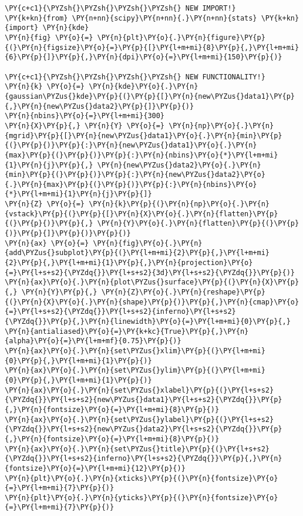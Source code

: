     \begin{tcolorbox}[breakable, size=fbox, boxrule=1pt, pad at break*=1mm,colback=cellbackground, colframe=cellborder]
\begin{Verbatim}[commandchars=\\\{\}]
\PY{c+c1}{\PYZsh{}\PYZsh{}\PYZsh{}\PYZsh{} NEW IMPORT!}
\PY{k+kn}{from} \PY{n+nn}{scipy}\PY{n+nn}{.}\PY{n+nn}{stats} \PY{k+kn}{import} \PY{n}{kde}
\PY{n}{fig} \PY{o}{=} \PY{n}{plt}\PY{o}{.}\PY{n}{figure}\PY{p}{(}\PY{n}{figsize}\PY{o}{=}\PY{p}{[}\PY{l+m+mi}{8}\PY{p}{,}\PY{l+m+mi}{6}\PY{p}{]}\PY{p}{,}\PY{n}{dpi}\PY{o}{=}\PY{l+m+mi}{150}\PY{p}{)} 

\PY{c+c1}{\PYZsh{}\PYZsh{}\PYZsh{}\PYZsh{} NEW FUNCTIONALITY!}
\PY{n}{k} \PY{o}{=} \PY{n}{kde}\PY{o}{.}\PY{n}{gaussian\PYZus{}kde}\PY{p}{(}\PY{p}{[}\PY{n}{new\PYZus{}data1}\PY{p}{,}\PY{n}{new\PYZus{}data2}\PY{p}{]}\PY{p}{)}
\PY{n}{nbins}\PY{o}{=}\PY{l+m+mi}{300}
\PY{n}{X}\PY{p}{,} \PY{n}{Y} \PY{o}{=} \PY{n}{np}\PY{o}{.}\PY{n}{mgrid}\PY{p}{[}\PY{n}{new\PYZus{}data1}\PY{o}{.}\PY{n}{min}\PY{p}{(}\PY{p}{)}\PY{p}{:}\PY{n}{new\PYZus{}data1}\PY{o}{.}\PY{n}{max}\PY{p}{(}\PY{p}{)}\PY{p}{:}\PY{n}{nbins}\PY{o}{*}\PY{l+m+mi}{1}\PY{n}{j}\PY{p}{,} \PY{n}{new\PYZus{}data2}\PY{o}{.}\PY{n}{min}\PY{p}{(}\PY{p}{)}\PY{p}{:}\PY{n}{new\PYZus{}data2}\PY{o}{.}\PY{n}{max}\PY{p}{(}\PY{p}{)}\PY{p}{:}\PY{n}{nbins}\PY{o}{*}\PY{l+m+mi}{1}\PY{n}{j}\PY{p}{]}
\PY{n}{Z} \PY{o}{=} \PY{n}{k}\PY{p}{(}\PY{n}{np}\PY{o}{.}\PY{n}{vstack}\PY{p}{(}\PY{p}{[}\PY{n}{X}\PY{o}{.}\PY{n}{flatten}\PY{p}{(}\PY{p}{)}\PY{p}{,} \PY{n}{Y}\PY{o}{.}\PY{n}{flatten}\PY{p}{(}\PY{p}{)}\PY{p}{]}\PY{p}{)}\PY{p}{)}
\PY{n}{ax} \PY{o}{=} \PY{n}{fig}\PY{o}{.}\PY{n}{add\PYZus{}subplot}\PY{p}{(}\PY{l+m+mi}{2}\PY{p}{,}\PY{l+m+mi}{2}\PY{p}{,}\PY{l+m+mi}{1}\PY{p}{,}\PY{n}{projection}\PY{o}{=}\PY{l+s+s2}{\PYZdq{}}\PY{l+s+s2}{3d}\PY{l+s+s2}{\PYZdq{}}\PY{p}{)}
\PY{n}{ax}\PY{o}{.}\PY{n}{plot\PYZus{}surface}\PY{p}{(}\PY{n}{X}\PY{p}{,} \PY{n}{Y}\PY{p}{,} \PY{n}{Z}\PY{o}{.}\PY{n}{reshape}\PY{p}{(}\PY{n}{X}\PY{o}{.}\PY{n}{shape}\PY{p}{)}\PY{p}{,}\PY{n}{cmap}\PY{o}{=}\PY{l+s+s2}{\PYZdq{}}\PY{l+s+s2}{inferno}\PY{l+s+s2}{\PYZdq{}}\PY{p}{,}\PY{n}{linewidth}\PY{o}{=}\PY{l+m+mi}{0}\PY{p}{,} \PY{n}{antialiased}\PY{o}{=}\PY{k+kc}{True}\PY{p}{,}\PY{n}{alpha}\PY{o}{=}\PY{l+m+mf}{0.75}\PY{p}{)}
\PY{n}{ax}\PY{o}{.}\PY{n}{set\PYZus{}xlim}\PY{p}{(}\PY{l+m+mi}{0}\PY{p}{,}\PY{l+m+mi}{1}\PY{p}{)}
\PY{n}{ax}\PY{o}{.}\PY{n}{set\PYZus{}ylim}\PY{p}{(}\PY{l+m+mi}{0}\PY{p}{,}\PY{l+m+mi}{1}\PY{p}{)}
\PY{n}{ax}\PY{o}{.}\PY{n}{set\PYZus{}xlabel}\PY{p}{(}\PY{l+s+s2}{\PYZdq{}}\PY{l+s+s2}{new\PYZus{}data1}\PY{l+s+s2}{\PYZdq{}}\PY{p}{,}\PY{n}{fontsize}\PY{o}{=}\PY{l+m+mi}{8}\PY{p}{)}
\PY{n}{ax}\PY{o}{.}\PY{n}{set\PYZus{}ylabel}\PY{p}{(}\PY{l+s+s2}{\PYZdq{}}\PY{l+s+s2}{new\PYZus{}data2}\PY{l+s+s2}{\PYZdq{}}\PY{p}{,}\PY{n}{fontsize}\PY{o}{=}\PY{l+m+mi}{8}\PY{p}{)}
\PY{n}{ax}\PY{o}{.}\PY{n}{set\PYZus{}title}\PY{p}{(}\PY{l+s+s2}{\PYZdq{}}\PY{l+s+s2}{inferno}\PY{l+s+s2}{\PYZdq{}}\PY{p}{,}\PY{n}{fontsize}\PY{o}{=}\PY{l+m+mi}{12}\PY{p}{)}
\PY{n}{plt}\PY{o}{.}\PY{n}{xticks}\PY{p}{(}\PY{n}{fontsize}\PY{o}{=}\PY{l+m+mi}{7}\PY{p}{)}
\PY{n}{plt}\PY{o}{.}\PY{n}{yticks}\PY{p}{(}\PY{n}{fontsize}\PY{o}{=}\PY{l+m+mi}{7}\PY{p}{)}


\end{Verbatim}
\end{tcolorbox}
